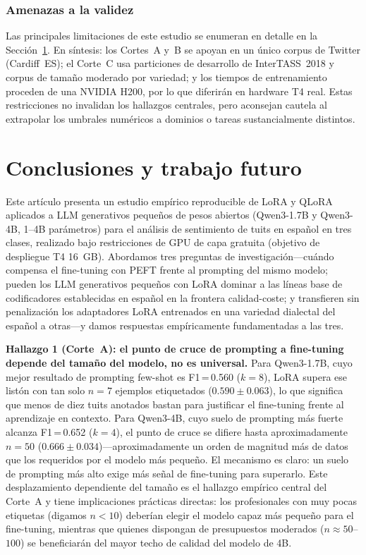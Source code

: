 \documentclass[conference]{IEEEtran}
\begin{document}
\subsubsection*{Amenazas a la validez}

Las principales limitaciones de este estudio se enumeran en detalle en la
Sección~\ref{sec:conclusions}.
En síntesis: los Cortes~A y~B se apoyan en un único corpus de Twitter
(Cardiff~ES); el Corte~C usa particiones de desarrollo de InterTASS~2018 y
corpus de tamaño moderado por variedad; y los tiempos de entrenamiento proceden
de una NVIDIA H200, por lo que diferirán en hardware T4 real.
Estas restricciones no invalidan los hallazgos centrales, pero aconsejan cautela
al extrapolar los umbrales numéricos a dominios o tareas sustancialmente distintos.


\section{Conclusiones y trabajo futuro}
\label{sec:conclusions}

Este artículo presenta un estudio empírico reproducible de LoRA y QLoRA
aplicados a LLM generativos pequeños de pesos abiertos (Qwen3-1.7B y Qwen3-4B,
1--4B parámetros) para el análisis de sentimiento de tuits en español en tres
clases, realizado bajo restricciones de GPU de capa gratuita (objetivo de
despliegue T4 16~GB).
Abordamos tres preguntas de investigación---cuándo compensa el fine-tuning con
PEFT frente al prompting del mismo modelo; pueden los LLM generativos pequeños
con LoRA dominar a las líneas base de codificadores establecidas en español en
la frontera calidad-coste; y transfieren sin penalización los adaptadores LoRA
entrenados en una variedad dialectal del español a otras---y damos respuestas
empíricamente fundamentadas a las tres.

\textbf{Hallazgo 1 (Corte~A): el punto de cruce de prompting a fine-tuning
depende del tamaño del modelo, no es universal.}
Para Qwen3-1.7B, cuyo mejor resultado de prompting few-shot es F1\,=\,0.560
($k=8$), LoRA supera ese listón con tan solo $n=7$ ejemplos etiquetados
($0.590 \pm 0.063$), lo que significa que menos de diez tuits anotados bastan
para justificar el fine-tuning frente al aprendizaje en contexto.
Para Qwen3-4B, cuyo suelo de prompting más fuerte alcanza F1\,=\,0.652 ($k=4$),
el punto de cruce se difiere hasta aproximadamente $n=50$
($0.666 \pm 0.034$)---aproximadamente un orden de magnitud más de datos que los
requeridos por el modelo más pequeño.
El mecanismo es claro: un suelo de prompting más alto exige más señal de
fine-tuning para superarlo.
Este desplazamiento dependiente del tamaño es el hallazgo empírico central del
Corte~A y tiene implicaciones prácticas directas: los profesionales con muy pocas
etiquetas (digamos $n < 10$) deberían elegir el modelo capaz más pequeño para el
fine-tuning, mientras que quienes dispongan de presupuestos moderados
($n \approx 50$--$100$) se beneficiarán del mayor techo de calidad del modelo de
4B.
\end{document}
